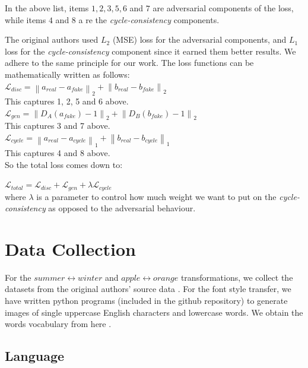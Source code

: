 \documentclass[10pt,twocolumn,letterpaper]{article}
\newcommand{\norm}[1]{\left\lVert#1\right\rVert}
\begin{document}
In the above list, items $1, 2, 3, 5, 6$ and $7$ are adversarial components of the loss, while items 
$4$ and $8$ a re the \textit{cycle-consistency} components.

The original authors used $L_2$ (MSE) loss for the adversarial components, and $L_1$ loss for the 
\textit{cycle-consistency} component since it earned them better results. We adhere to the same 
principle for our work. The loss functions can be mathematically written as follows:\\


$\mathcal{L}_{disc} = \norm{a_{real} - a_{fake}}_2 + \norm{b_{real} - b_{fake}}_2$ \\ 

This captures 1, 2, 5 and 6 above.\\

$\mathcal{L}_{gen} = \norm{D_A(a_{fake}) - 1}_2 + \norm{D_B(b_{fake}) - 1}_2$ \\

This captures 3  and 7 above.\\

$\mathcal{L}_{cycle} = \norm{a_{real} - a_{cycle}}_1  + \norm{b_{real} - b_{cycle}}_1$ \\ 

This captures 4 and 8 above.\\

So the total loss comes down to:

$\mathcal{L}_{total} = \mathcal{L}_{disc} + \mathcal{L}_{gen} + \lambda\mathcal{L}_{cycle}$\\

where $\lambda$ is a parameter to control how much weight we want to put on the \textit{cycle-consistency} as opposed to the adversarial behaviour.

\section{Data Collection}

For the $summer \leftrightarrow winter$ and $apple \leftrightarrow orange$ transformations, we collect 
the datasets from the original authors' source data \cite{data1}. For the font style transfer, we have written python programs (included in the github repository) to generate images of single uppercase English characters and lowercase words. We obtain the words vocabulary from here \cite{data2}.

\subsection{Language}
\end{document}
